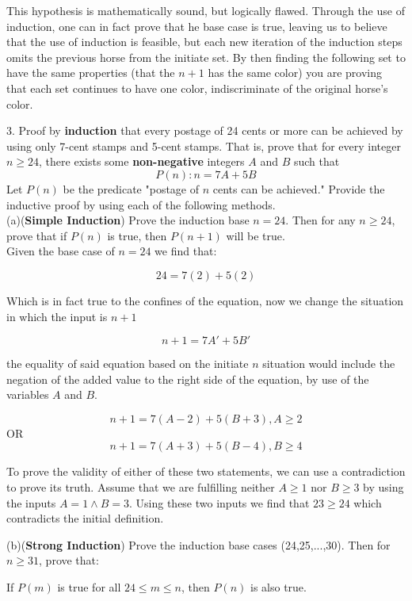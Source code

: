 \documentclass[10pt]{article}
\begin{document}
This hypothesis is mathematically sound, but logically flawed. Through the use of induction, one can in fact prove that he base case is true, leaving us to believe that the use of induction is feasible, but each new iteration of the induction steps omits the previous horse from the initiate set.  By then finding the following set to have the same properties (that the $n+1$ has the same color) you are proving that each set continues to have one color, indiscriminate of the original horse's color.

3. Proof by \textbf{induction} that every postage of 24 cents or more can be achieved by using only 7-cent stamps and 5-cent stamps.  That is, prove that for every integer $n \geq 24$, there exists some \textbf{non-negative} integers $A$ and $B$ such that
$$P(n): n = 7A + 5B$$
Let $P(n)$ be the predicate "postage of $n$ cents can be achieved." Provide the inductive proof by using each of the following methods.\\
(a)(\textbf{Simple Induction}) Prove the induction base $n = 24$.  Then for any $n \geq 24$, prove that if $P(n)$ is true, then $P(n + 1)$ will be true.\\
Given the base case of $n = 24$ we find that:

$$24 = 7(2) + 5(2)$$

Which is in fact true to the confines of the equation, now we change the situation in which the input is $n + 1$

$$n+1 = 7A' + 5B'$$

the equality of said equation based on the initiate $n$ situation would include the negation of the added value to the right side of the equation, by use of the variables $A$ and $B$.

$$n+1 = 7(A-2) + 5(B+3), A \geq 2$$
OR
$$n+1 = 7(A+3) + 5(B-4), B \geq 4$$

To prove the validity of either of these two statements, we can use a contradiction to prove its truth.  Assume that we are fulfilling neither $A \geq 1$ nor $B \geq 3$ by using the inputs $A = 1 \wedge B = 3$.  Using these two inputs we find that $23 \geq 24$ which contradicts the initial definition.

(b)(\textbf{Strong Induction}) Prove the induction base cases (24,25,...,30).  Then for $n \geq 31$, prove that:

\center
If $P(m)$ is true for all $24 \leq m \leq n$, then $P(n)$ is also true.\\
\flushleft
\end{document}

